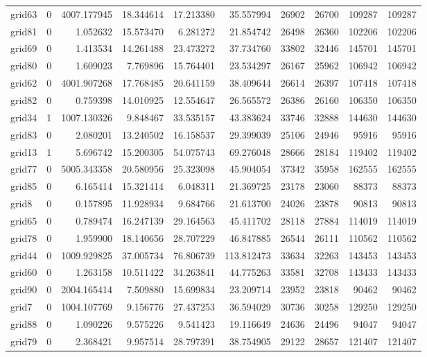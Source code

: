 \begin{longtable}{|l|r|r|r|r|r|r|r|r|r|}
grid63 & 0 & 4007.177945 & 18.344614 & 17.213380 & 35.557994 & 26902 & 26700 & 109287 & 109287 \\
grid81 & 0 & 1.052632 & 15.573470 & 6.281272 & 21.854742 & 26498 & 26360 & 102206 & 102206 \\
grid69 & 0 & 1.413534 & 14.261488 & 23.473272 & 37.734760 & 33802 & 32446 & 145701 & 145701 \\
grid80 & 0 & 1.609023 & 7.769896 & 15.764401 & 23.534297 & 26167 & 25962 & 106942 & 106942 \\
grid62 & 0 & 4001.907268 & 17.768485 & 20.641159 & 38.409644 & 26614 & 26397 & 107418 & 107418 \\
grid82 & 0 & 0.759398 & 14.010925 & 12.554647 & 26.565572 & 26386 & 26160 & 106350 & 106350 \\
grid34 & 1 & 1007.130326 & 9.848467 & 33.535157 & 43.383624 & 33746 & 32888 & 144630 & 144630 \\
grid83 & 0 & 2.080201 & 13.240502 & 16.158537 & 29.399039 & 25106 & 24946 & 95916 & 95916 \\
grid13 & 1 & 5.696742 & 15.200305 & 54.075743 & 69.276048 & 28666 & 28184 & 119402 & 119402 \\
grid77 & 0 & 5005.343358 & 20.580956 & 25.323098 & 45.904054 & 37342 & 35958 & 162555 & 162555 \\
grid85 & 0 & 6.165414 & 15.321414 & 6.048311 & 21.369725 & 23178 & 23060 & 88373 & 88373 \\
grid8 & 0 & 0.157895 & 11.928934 & 9.684766 & 21.613700 & 24026 & 23878 & 90813 & 90813 \\
grid65 & 0 & 0.789474 & 16.247139 & 29.164563 & 45.411702 & 28118 & 27884 & 114019 & 114019 \\
grid78 & 0 & 1.959900 & 18.140656 & 28.707229 & 46.847885 & 26544 & 26111 & 110562 & 110562 \\
grid44 & 0 & 1009.929825 & 37.005734 & 76.806739 & 113.812473 & 33634 & 32263 & 143453 & 143453 \\
grid60 & 0 & 1.263158 & 10.511422 & 34.263841 & 44.775263 & 33581 & 32708 & 143433 & 143433 \\
grid90 & 0 & 2004.165414 & 7.509880 & 15.699834 & 23.209714 & 23952 & 23818 & 90462 & 90462 \\
grid7 & 0 & 1004.107769 & 9.156776 & 27.437253 & 36.594029 & 30736 & 30258 & 129250 & 129250 \\
grid88 & 0 & 1.090226 & 9.575226 & 9.541423 & 19.116649 & 24636 & 24496 & 94047 & 94047 \\
grid79 & 0 & 2.368421 & 9.957514 & 28.797391 & 38.754905 & 29122 & 28657 & 121407 & 121407 \\

\end{longtable}
